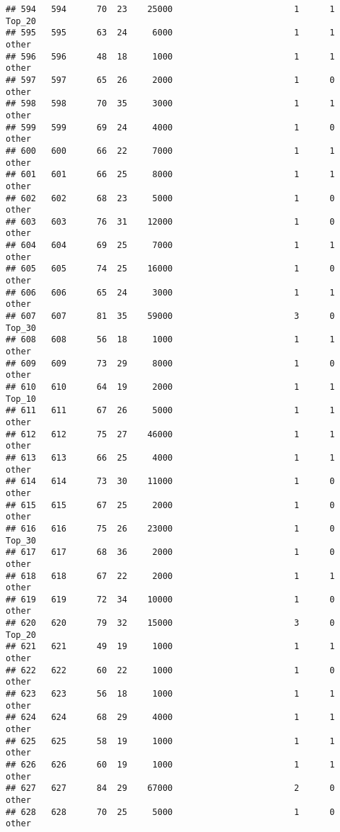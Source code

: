 \documentclass[
]{article}
\begin{document}
\begin{verbatim}
## 594   594      70  23    25000                        1      1   Top_20
## 595   595      63  24     6000                        1      1    other
## 596   596      48  18     1000                        1      1    other
## 597   597      65  26     2000                        1      0    other
## 598   598      70  35     3000                        1      1    other
## 599   599      69  24     4000                        1      0    other
## 600   600      66  22     7000                        1      1    other
## 601   601      66  25     8000                        1      1    other
## 602   602      68  23     5000                        1      0    other
## 603   603      76  31    12000                        1      0    other
## 604   604      69  25     7000                        1      1    other
## 605   605      74  25    16000                        1      0    other
## 606   606      65  24     3000                        1      1    other
## 607   607      81  35    59000                        3      0   Top_30
## 608   608      56  18     1000                        1      1    other
## 609   609      73  29     8000                        1      0    other
## 610   610      64  19     2000                        1      1   Top_10
## 611   611      67  26     5000                        1      1    other
## 612   612      75  27    46000                        1      1    other
## 613   613      66  25     4000                        1      1    other
## 614   614      73  30    11000                        1      0    other
## 615   615      67  25     2000                        1      0    other
## 616   616      75  26    23000                        1      0   Top_30
## 617   617      68  36     2000                        1      0    other
## 618   618      67  22     2000                        1      1    other
## 619   619      72  34    10000                        1      0    other
## 620   620      79  32    15000                        3      0   Top_20
## 621   621      49  19     1000                        1      1    other
## 622   622      60  22     1000                        1      0    other
## 623   623      56  18     1000                        1      1    other
## 624   624      68  29     4000                        1      1    other
## 625   625      58  19     1000                        1      1    other
## 626   626      60  19     1000                        1      1    other
## 627   627      84  29    67000                        2      0    other
## 628   628      70  25     5000                        1      0    other

\end{verbatim}
\end{document}
